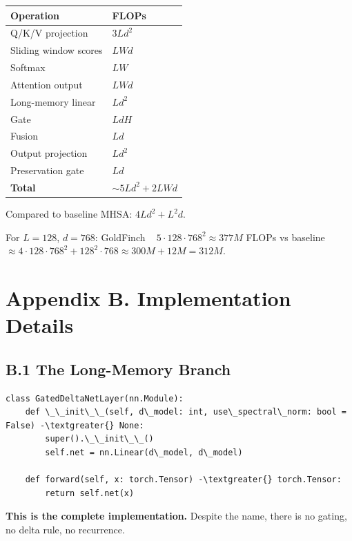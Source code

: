 \begin{table}[H]
\centering
\small
\begin{tabular}{ll}
\toprule
\textbf{Operation} & \textbf{FLOPs} \\
\midrule
Q/K/V projection & $3 L d^2$ \\
Sliding window scores & $L W d$ \\
Softmax & $L W$ \\
Attention output & $L W d$ \\
Long-memory linear & $L d^2$ \\
Gate & $L d H$ \\
Fusion & $L d$ \\
Output projection & $L d^2$ \\
Preservation gate & $L d$ \\
\textbf{Total} & $\sim 5 L d^2 + 2 L W d$ \\
\bottomrule
\end{tabular}
\end{table}

Compared to baseline MHSA: $4 L d^2 + L^2 d$.

For $L = 128$, $d = 768$: GoldFinch ~ $5 \cdot 128 \cdot 768^2 \approx 
377M$ FLOPs vs baseline $\approx 4 \cdot 128 \cdot 768^2 + 128^2 \cdot 768 
\approx 300M + 12M = 312M$.




\section{Appendix B. Implementation Details}

\subsection{B.1 The Long-Memory Branch}

\begin{lstlisting}
class GatedDeltaNetLayer(nn.Module):
    def \_\_init\_\_(self, d\_model: int, use\_spectral\_norm: bool = False) -\textgreater{} None:
        super().\_\_init\_\_()
        self.net = nn.Linear(d\_model, d\_model)

    def forward(self, x: torch.Tensor) -\textgreater{} torch.Tensor:
        return self.net(x)
\end{lstlisting}

\textbf{This is the complete implementation.} Despite the name, there is no 
gating, no delta rule, no recurrence.

